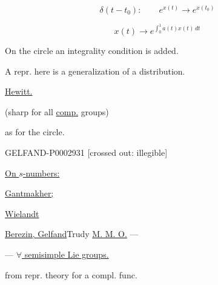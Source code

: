 \begin{equation*}\delta (t-t_0):\qquad e^{x (t)}\longrightarrow e^{x (t_0)}\end{equation*}

\begin{equation*}x (t)\longrightarrow e^{\int_0^1 a (t)x (t)\, dt}\end{equation*}

On the circle an integrality condition is added.

\begin{center}\end{center}

A repr. here is a generalization of a distribution.



\hfill{}

\qquad\underline{Hewitt.}

 (sharp for all \underline{comp.} groups)

as for the circle.





\begin{GelfandAdjacentEvidence}{GELFAND-P000293}{1}
[crossed out: illegible]

\end{GelfandAdjacentEvidence}


\underline{On $s$-numbers:}

\begin{flushright}\begin{minipage}{.76\linewidth}
\underline{Gantmakher;}\par
\underline{Wielandt}\par
\underline{Berezin, Gelfand}\qquad Trudy \underline{M. M. O.} ---\par
--- \underline{$\forall$ semisimple Lie groups.}\par
from repr. theory for a compl. func.
\end{minipage}\end{flushright}





